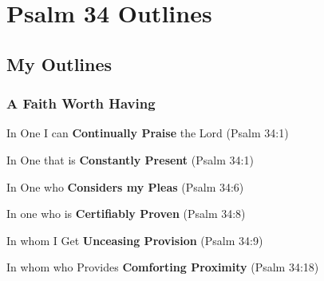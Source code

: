 \section{Psalm 34 Outlines}

\subsection{My Outlines}

\subsubsection{A Faith Worth Having}
\begin{compactenum}[I.][8]
    \item In One I can \textbf{Continually Praise} the Lord (Psalm 34:1)
    \item In One that is \textbf{Constantly Present} (Psalm 34:1)
    \item In One who \textbf{Considers my Pleas} (Psalm 34:6)
    \item In one who is \textbf{Certifiably Proven} (Psalm 34:8)
    \item In whom I Get \textbf{Unceasing Provision} (Psalm 34:9)
    \item In whom who Provides \textbf{Comforting Proximity} (Psalm 34:18)
\end{compactenum}


